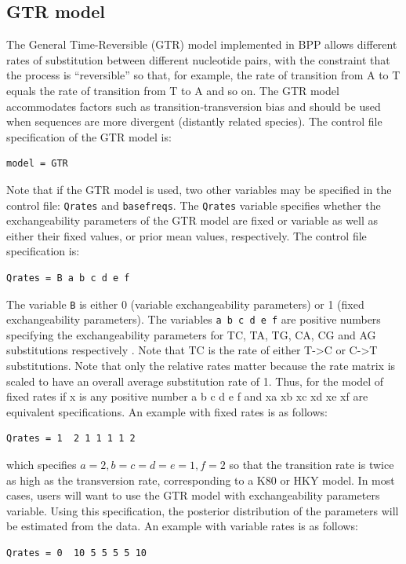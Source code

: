 \documentclass{book}
\numberwithin{equation}{section} \renewcommand{\baselinestretch}{0.55}
\begin{document}
\subsection{GTR model}
The General Time-Reversible (GTR) model implemented in BPP
allows different rates of substitution between different nucleotide
pairs, with the constraint that the process is ``reversible'' so that,
for example, the rate of transition from A to T equals the rate of
transition from T to A and so on.  The GTR model accommodates factors
such as transition-transversion bias and should be used when sequences
are more divergent (distantly related species). The control file
specification of the GTR model is:
\begin{verbatim}
model = GTR
\end{verbatim}
Note that if the GTR model is used, two other variables may be
specified in the control file: \texttt{Qrates} and
\texttt{basefreqs}. The \texttt{Qrates} variable specifies whether the
exchangeability parameters of the GTR model are fixed or variable as
well as either their fixed values, or prior mean values,
respectively. The control file specification is:
\begin{verbatim}
Qrates = B a b c d e f
\end{verbatim}
The variable \texttt{B} is either 0 (variable exchangeability
parameters) or 1 (fixed exchangeability parameters).  The variables
\texttt{a b c d e f} are positive numbers specifying the
exchangeability parameters for TC, TA, TG, CA, CG and AG substitutions
respectively \cite[see][]{Yang1994a}. Note that TC is the rate of
either T->C or C->T substitutions.  Note that only the relative rates
matter because the rate matrix is scaled to have an overall average
substitution rate of 1. Thus, for the model of fixed rates if x is any
positive number a b c d e f and xa xb xc xd xe xf are equivalent
specifications.  An example with fixed rates is as follows:
\begin{verbatim}
Qrates = 1  2 1 1 1 1 2
\end{verbatim}
which specifies $a=2,b=c=d=e=1,f=2$ so that the transition rate is
twice as high as the transversion rate, corresponding to a K80 or HKY
model.  In most cases, users will want to use the GTR model with
exchangeability parameters variable. Using this specification, the
posterior distribution of the parameters will be estimated from the
data.  An example with variable rates is as follows:
\begin{verbatim}
Qrates = 0  10 5 5 5 5 10
\end{verbatim}
\end{document}
